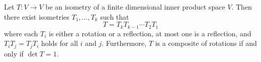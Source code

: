 \documentclass[12pt]{article}
\begin{document}
\begin{theorem}{}{}
    Let $ T : V \to V $ be an isometry of a finite dimensional inner product space $ V $. Then there exist isometries $ T_1, \dots, T_k $ such that
    \[ T = T_k T_{k - 1} \cdots T_2 T_1 \]
    where each $ T_i $ is either a rotation or a reflection, at most one is a reflection, and $ T_i T_j = T_j T_i $ holds for all $ i $ and $ j $. Furthermore, $ T $ is a composite of rotations if and only if $ \det T = 1 $.
\end{theorem}
\end{document}
